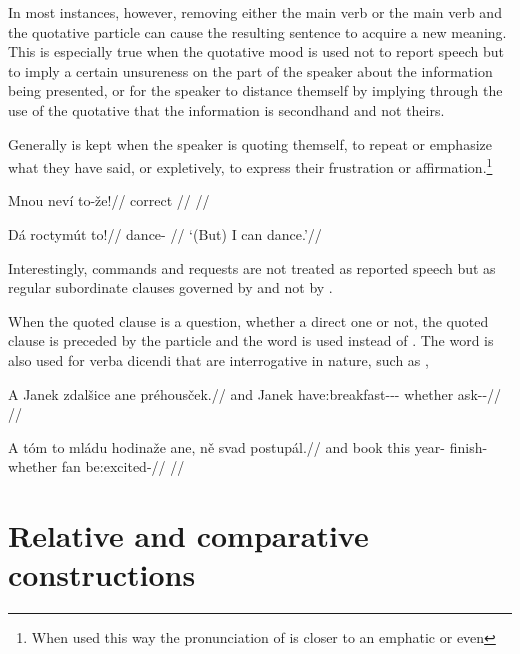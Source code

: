 In most instances, however, removing either the main verb or the main verb and the quotative particle can cause the resulting sentence to acquire a new meaning. This is especially true when the quotative mood is used not to report speech but to imply a certain unsureness on the part of the speaker about the information being presented, or for the speaker to distance themself by implying through the use of the quotative that the information is secondhand and not theirs.

Generally  is kept when the speaker is quoting themself, to repeat or emphasize what they have said, or expletively, to express their frustration or affirmation.\footnote{When used this way the pronunciation of  is closer to an emphatic  or even }


\pex
\begingl
\gla Mnou neví to-že!//
\glb correct  //
\glft {}//
\endgl
\xe

\pex
\begingl
\gla Dá roctymút to!//
\glb \First{}\Sg{} dance- //
\glft `(But) I can dance.'//
\endgl
\xe


Interestingly, commands and requests are not treated as reported speech but as regular subordinate clauses governed by  and not by .

When the quoted clause is a question, whether a direct one or not, the quoted clause is preceded by the particle  and the word  is used instead of . The word  is also used for verba dicendi that are interrogative in nature, such as ,

\pex
\begingl
  \gla A Janek zdalšice ane préhousček.//
  \glb and Janek have:breakfast-\Av{}-\Pf{}-\Quot{} whether ask-\Av{}-\Pf{}//
  \glft {}//
\endgl
\xe

\pex
\begingl
  \gla A tóm to mládu hodinaže ane, ně svad postupál.//
  \glb and book this year-\Ins{} finish- whether \Pl{} fan be:excited-//
  \glft {}//
\endgl
\xe



\section{Relative and comparative constructions}\label{relativecomparative}

